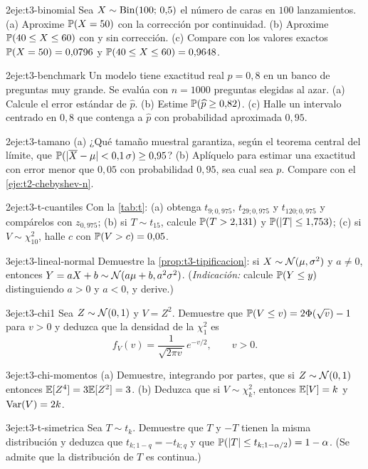 \begin{ejercicio}{2}{eje:t3-binomial}
Sea $X\sim\operatorname{Bin}(100;\,0{,}5)$ el número de caras en $100$ lanzamientos. (a) Aproxime $\mathbb{P}(X=50)$ con la corrección por continuidad. (b) Aproxime $\mathbb{P}(40\le X\le60)$ con y sin corrección. (c) Compare con los valores exactos $\mathbb{P}(X=50)=0{,}0796$ y $\mathbb{P}(40\le X\le60)=0{,}9648$.
\end{ejercicio}

\begin{ejercicio}{2}{eje:t3-benchmark}
Un modelo tiene exactitud real $p=0{,}8$ en un banco de preguntas muy grande. Se evalúa con $n=1000$ preguntas elegidas al azar. (a) Calcule el error estándar de $\widehat p$. (b) Estime $\mathbb{P}(\widehat p\ge0{,}82)$. (c) Halle un intervalo centrado en $0{,}8$ que contenga a $\widehat p$ con probabilidad aproximada $0{,}95$.
\end{ejercicio}

\begin{ejercicio}{2}{eje:t3-tamano}
(a) ¿Qué tamaño muestral garantiza, según el teorema central del límite, que $\mathbb{P}(\lvert\overline{X}-\mu\rvert<0{,}1\,\sigma)\ge0{,}95$? (b) Aplíquelo para estimar una exactitud con error menor que $0{,}05$ con probabilidad $0{,}95$, sea cual sea $p$. Compare con el \cref{eje:t2-chebyshev-n}.
\end{ejercicio}

\begin{ejercicio}{2}{eje:t3-t-cuantiles}
Con la \cref{tab:t}: (a) obtenga $t_{9;0{,}975}$, $t_{29;0{,}975}$ y $t_{120;0{,}975}$ y compárelos con $z_{0{,}975}$; (b) si $T\sim t_{15}$, calcule $\mathbb{P}(T>2{,}131)$ y $\mathbb{P}(\lvert T\rvert\le1{,}753)$; (c) si $V\sim\chi^{2}_{10}$, halle $c$ con $\mathbb{P}(V>c)=0{,}05$.
\end{ejercicio}

\begin{ejercicio}{3}{eje:t3-lineal-normal}
Demuestre la \cref{prop:t3-tipificacion}: si $X\sim\mathcal{N}(\mu,\sigma^{2})$ y $a\ne0$, entonces $Y=aX+b\sim\mathcal{N}(a\mu+b,a^{2}\sigma^{2})$. (\emph{Indicación:} calcule $\mathbb{P}(Y\le y)$ distinguiendo $a>0$ y $a<0$, y derive.)
\end{ejercicio}

\begin{ejercicio}{3}{eje:t3-chi1}
Sea $Z\sim\mathcal{N}(0,1)$ y $V=Z^{2}$. Demuestre que $\mathbb{P}(V\le v)=2\Phi(\sqrt v)-1$ para $v>0$ y deduzca que la densidad de la $\chi^{2}_1$ es
\[
f_V(v)=\frac{1}{\sqrt{2\pi v}}\,e^{-v/2},\qquad v>0.
\]
\end{ejercicio}

\begin{ejercicio}{3}{eje:t3-chi-momentos}
(a) Demuestre, integrando por partes, que si $Z\sim\mathcal{N}(0,1)$ entonces $\mathbb{E}[Z^{4}]=3\mathbb{E}[Z^{2}]=3$. (b) Deduzca que si $V\sim\chi^{2}_k$, entonces $\mathbb{E}[V]=k$ y $\operatorname{Var}(V)=2k$.
\end{ejercicio}

\begin{ejercicio}{3}{eje:t3-t-simetrica}
Sea $T\sim t_k$. Demuestre que $T$ y $-T$ tienen la misma distribución y deduzca que $t_{k;1-q}=-t_{k;q}$ y que $\mathbb{P}(\lvert T\rvert\le t_{k;1-\alpha/2})=1-\alpha$. (Se admite que la distribución de $T$ es continua.)
\end{ejercicio}
